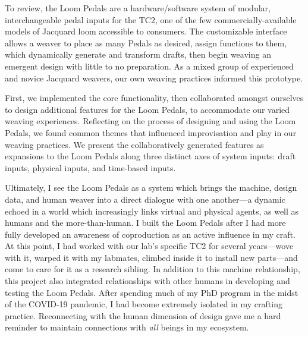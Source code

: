 To review, the Loom Pedals are a hardware/software system of modular, interchangeable pedal inputs for the TC2, one of the few commercially-available models of Jacquard loom accessible to consumers. The customizable interface allows a weaver to place as many Pedals as desired, assign functions to them, which dynamically generate and transform drafts, then begin weaving an emergent design with little to no preparation. As a mixed group of experienced and novice Jacquard weavers, our own weaving practices informed this prototype. 

First, we implemented the core functionality, then collaborated amongst ourselves to design additional features for the Loom Pedals, to accommodate our varied weaving experiences. Reflecting on the process of designing and using the Loom Pedals, we found common themes that influenced improvisation and play in our weaving practices. We present the collaboratively generated features as expansions to the Loom Pedals along three distinct axes of system inputs: draft inputs, physical inputs, and time-based inputs. 

Ultimately, I see the Loom Pedals as a system which brings the machine, design data, and human weaver into a direct dialogue with one another---a dynamic echoed in a world which increasingly links virtual and physical agents, as well as humans and the more-than-human. I built the Loom Pedals
after I had more fully developed an awareness of coproduction as an active influence in my craft. At this point, I had worked with our lab's specific TC2 for several years---wove with it, warped it with my labmates, climbed inside it to install new parts---and come to care for it as a research sibling. In addition to this machine relationship, this project also integrated relationships with other humans in developing and testing the Loom Pedals. After spending much of my PhD program in the midst of the COVID-19 pandemic, I had become extremely isolated in my crafting practice. Reconnecting with the human dimension of design gave me a hard reminder to maintain connections with \textit{all} beings in my ecosystem.


